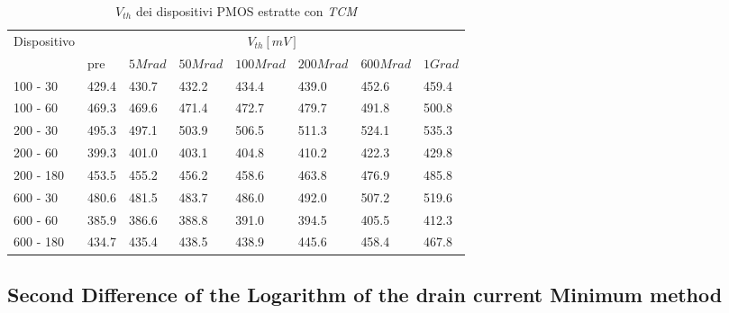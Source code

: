 \documentclass[12pt, letterpaper]{book}
\begin{document}
\begin{table}[H]
  \renewcommand{\arraystretch}{1.3}
  \begin{tabular}{m{2cm} m{0.8cm} m{1.1cm} m{1.3cm} m{1.5cm} m{1.5cm} m{1.5cm} m{1cm}}
    \toprule
    \multirow{2}{*}{Dispositivo} & \multicolumn{7}{c}{$V_{th} [mV] $}                                                                    \\
    \cmidrule{2-8}
                                 & pre                                & $5Mrad$ & $50Mrad$ & $100Mrad$ & $200Mrad$ & $600Mrad$ & $1Grad$ \\
    \midrule
    100 - 30                     & 429.4                              & 430.7   & 432.2    & 434.4     & 439.0     & 452.6     & 459.4   \\
    \hline
    100 - 60                     & 469.3                              & 469.6   & 471.4    & 472.7     & 479.7     & 491.8     & 500.8   \\
    \hline
    200 - 30                     & 495.3                              & 497.1   & 503.9    & 506.5     & 511.3     & 524.1     & 535.3   \\
    \hline
    200 - 60                     & 399.3                              & 401.0   & 403.1    & 404.8     & 410.2     & 422.3     & 429.8   \\
    \hline
    200 - 180                    & 453.5                              & 455.2   & 456.2    & 458.6     & 463.8     & 476.9     & 485.8   \\
    \hline
    600 - 30                     & 480.6                              & 481.5   & 483.7    & 486.0     & 492.0     & 507.2     & 519.6   \\
    \hline
    600 - 60                     & 385.9                              & 386.6   & 388.8    & 391.0     & 394.5     & 405.5     & 412.3   \\
    \hline
    600 - 180                    & 434.7                              & 435.4   & 438.5    & 438.9     & 445.6     & 458.4     & 467.8   \\
    \bottomrule
  \end{tabular}
  \caption{$V_{th}$ dei dispositivi PMOS estratte con \emph{TCM}}
  \label{tab:VthTCM}
\end{table}





\subsection{Second Difference of the Logarithm of the drain current Minimum method}
\end{document}

